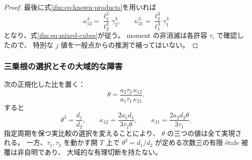\begin{proof}
最後に式\eqref{ifm:eq:known-products}を用いれば
\[
 \kappa_{12}^3=\frac{\ell_1^3}{\ell_2^3}\gamma_2^3,
 \qquad
 \kappa_{21}^3=\frac{\ell_2^3}{\ell_1^3}\gamma_1^3
\]
となり、式\eqref{ifm:eq:mixed-cubes}が従う。
moment の非消滅は各許容 $\tau_i$ で確認したので、
特別な $j$ 値を一般点からの推測で補ってはいない。
\end{proof}

\subsubsection{三乗根の選択とその大域的な障害}

\begin{corollary}
\label{ifm:cor:kummer-scale}
次の正規化した比を置く：
\begin{equation}\label{ifm:eq:theta}
 \theta=\frac{a_2\tau_2}{a_1\tau_1}\frac{\kappa_{12}}{\kappa_{21}}.
\end{equation}
すると
\begin{equation}\label{ifm:eq:kummer}
 \theta^3=\frac{d_1}{d_2},\qquad
 \kappa_{12}=\frac{2a_1d_1}{3\tau_2\theta},\qquad
 \kappa_{21}=\frac{2a_2d_2\theta}{3\tau_1}.
\end{equation}
指定周期を保つ実比較の選択を変えることにより、
$\theta$ の三つの値は全て実現される。
一方、$\tau_1,\tau_2$ を動かす開 $T$ 上で
$\theta^3=d_1/d_2$ が定める次数三の有限 \'etale 被覆は非自明であり、
大域的な有理切断を持たない。
\end{corollary}

